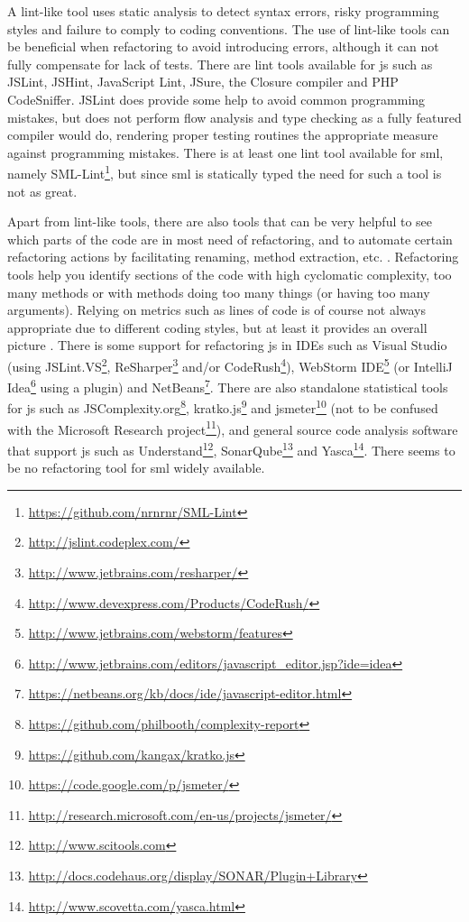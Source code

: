 \documentclass[11pt]{article}
\begin{document}
A lint-like tool uses static analysis to detect syntax errors, risky programming styles and failure to comply to coding conventions. The use of lint-like tools can be beneficial when refactoring to avoid introducing errors, although it can not fully compensate for lack of tests. There are lint tools available for \gls{js} such as JSLint, JSHint, JavaScript Lint, JSure, the Closure compiler and PHP CodeSniffer. JSLint does provide some help to avoid common programming mistakes, but does not perform flow analysis \cite{JSLint} and type checking as a fully featured compiler would do, rendering proper testing routines the appropriate measure against programming mistakes. There is at least one lint tool available for \gls{sml}, namely SML-Lint\footnote{\url{https://github.com/nrnrnr/SML-Lint}}, but since \gls{sml} is statically typed the need for such a tool is not as great.

Apart from lint-like tools, there are also tools that can be very helpful to see which parts of the code are in most need of refactoring, and to automate certain refactoring actions by facilitating renaming, method extraction, etc. \cite[ch.~5]{Legacy}. Refactoring tools help you identify sections of the code with high cyclomatic complexity, too many methods or with methods doing too many things (or having too many arguments). Relying on metrics such as lines of code is of course not always appropriate due to different coding styles, but at least it provides an overall picture \cite{Kratko}. There is some support for refactoring \gls{js} in IDEs such as Visual Studio (using
JSLint.VS\footnote{\url{http://jslint.codeplex.com/}},
ReSharper\footnote{\url{http://www.jetbrains.com/resharper/}} and/or
CodeRush\footnote{\url{http://www.devexpress.com/Products/CodeRush/}}),
WebStorm IDE\footnote{\url{http://www.jetbrains.com/webstorm/features}} (or
IntelliJ Idea\footnote{\url{http://www.jetbrains.com/editors/javascript_editor.jsp?ide=idea}} using a plugin) and
NetBeans\footnote{\url{https://netbeans.org/kb/docs/ide/javascript-editor.html}}. There are also standalone statistical tools for \gls{js} such as
JSComplexity.org\footnote{\url{https://github.com/philbooth/complexity-report}},
kratko.js\footnote{\url{https://github.com/kangax/kratko.js}} and
jsmeter\footnote{\url{https://code.google.com/p/jsmeter/}} (not to be confused with the
Microsoft Research project\footnote{\url{http://research.microsoft.com/en-us/projects/jsmeter/}}), and general source code analysis software that support \gls{js} such as
Understand\footnote{\url{http://www.scitools.com}},
SonarQube\footnote{\url{http://docs.codehaus.org/display/SONAR/Plugin+Library}} and
Yasca\footnote{\url{http://www.scovetta.com/yasca.html}}.
There seems to be no refactoring tool for \gls{sml} widely available.
\end{document}
